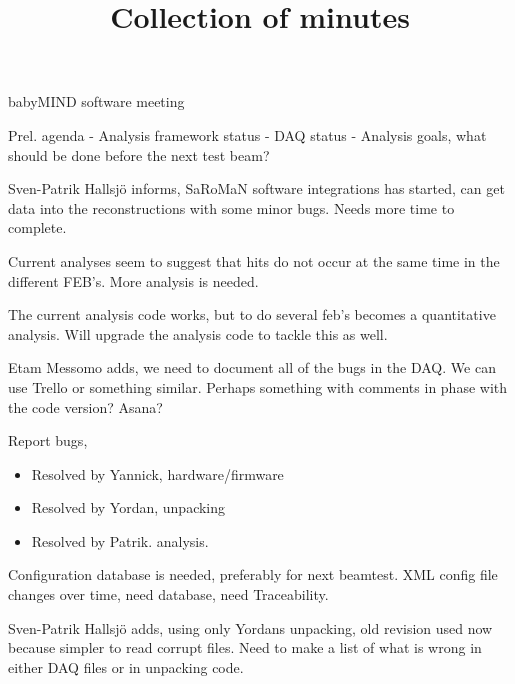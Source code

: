 \documentclass{article}
\title{Collection of minutes}
\author{\LaTeXe}
\begin{document}
\begin{Minutes}{babyMIND software meeting}

\maketitle

Prel. agenda
- Analysis framework status
- DAQ status
- Analysis goals, what should be done before the next test beam?

Sven-Patrik Hallsj\"o informs, SaRoMaN software integrations has started, can get data into the reconstructions with some minor bugs. Needs more time to complete.

Current analyses seem to suggest that hits do not occur at the same time in the different FEB's. More analysis is needed.

The current analysis code works, but to do several feb's becomes a quantitative analysis.
Will upgrade the analysis code to tackle this as well.

Etam Messomo adds, we need to document all of the bugs in the DAQ.
We can use Trello or something similar. Perhaps something with comments in phase with the code version? Asana?

Report bugs,
\begin{itemize}
\item Resolved by Yannick, hardware/firmware
\item Resolved by Yordan, unpacking
\item Resolved by Patrik. analysis.
\end{itemize}
Configuration database is needed, preferably for next beamtest.
XML config file changes over time, need database, need Traceability.

Sven-Patrik Hallsj\"o adds, using only Yordans unpacking, old revision used now because simpler to read corrupt files.
Need to make a list of what is wrong in either DAQ files or in unpacking code.


\end{Minutes}
\end{document}
